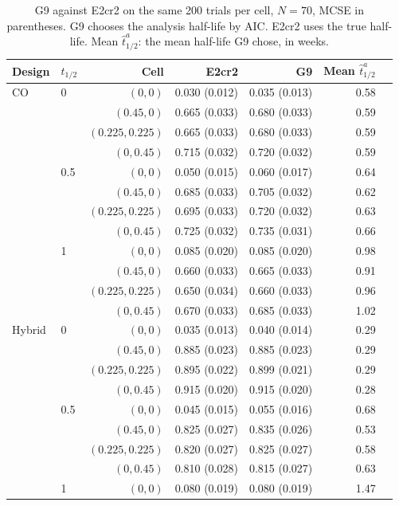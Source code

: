 \documentclass[
  11pt,
]{article}
\begin{document}
\begin{table}[H]
\small\centering
\caption{G9 against E2cr2 on the same 200 trials per cell, $N = 70$, MCSE in parentheses. G9 chooses the analysis half-life by AIC. E2cr2 uses the true half-life. Mean $\hat t_{1/2}^a$: the mean half-life G9 chose, in weeks.}
\label{tab:g9}
\begin{tabular}{llrrrrr}
\toprule
Design & $t_{1/2}$ & Cell & E2cr2 & G9 & Mean $\hat t_{1/2}^a$ \\
\midrule
CO & 0 & $(0, 0)$ & 0.030 (0.012) & 0.035 (0.013) & 0.58 \\
 &  & $(0.45, 0)$ & 0.665 (0.033) & 0.680 (0.033) & 0.59 \\
 &  & $(0.225, 0.225)$ & 0.665 (0.033) & 0.680 (0.033) & 0.59 \\
 &  & $(0, 0.45)$ & 0.715 (0.032) & 0.720 (0.032) & 0.59 \\
 & 0.5 & $(0, 0)$ & 0.050 (0.015) & 0.060 (0.017) & 0.64 \\
 &  & $(0.45, 0)$ & 0.685 (0.033) & 0.705 (0.032) & 0.62 \\
 &  & $(0.225, 0.225)$ & 0.695 (0.033) & 0.720 (0.032) & 0.63 \\
 &  & $(0, 0.45)$ & 0.725 (0.032) & 0.735 (0.031) & 0.66 \\
 & 1 & $(0, 0)$ & 0.085 (0.020) & 0.085 (0.020) & 0.98 \\
 &  & $(0.45, 0)$ & 0.660 (0.033) & 0.665 (0.033) & 0.91 \\
 &  & $(0.225, 0.225)$ & 0.650 (0.034) & 0.660 (0.033) & 0.96 \\
 &  & $(0, 0.45)$ & 0.670 (0.033) & 0.685 (0.033) & 1.02 \\
Hybrid & 0 & $(0, 0)$ & 0.035 (0.013) & 0.040 (0.014) & 0.29 \\
 &  & $(0.45, 0)$ & 0.885 (0.023) & 0.885 (0.023) & 0.29 \\
 &  & $(0.225, 0.225)$ & 0.895 (0.022) & 0.899 (0.021) & 0.29 \\
 &  & $(0, 0.45)$ & 0.915 (0.020) & 0.915 (0.020) & 0.28 \\
 & 0.5 & $(0, 0)$ & 0.045 (0.015) & 0.055 (0.016) & 0.68 \\
 &  & $(0.45, 0)$ & 0.825 (0.027) & 0.835 (0.026) & 0.53 \\
 &  & $(0.225, 0.225)$ & 0.820 (0.027) & 0.825 (0.027) & 0.58 \\
 &  & $(0, 0.45)$ & 0.810 (0.028) & 0.815 (0.027) & 0.63 \\
 & 1 & $(0, 0)$ & 0.080 (0.019) & 0.080 (0.019) & 1.47 \\

\end{tabular}
\end{table}
\end{document}
